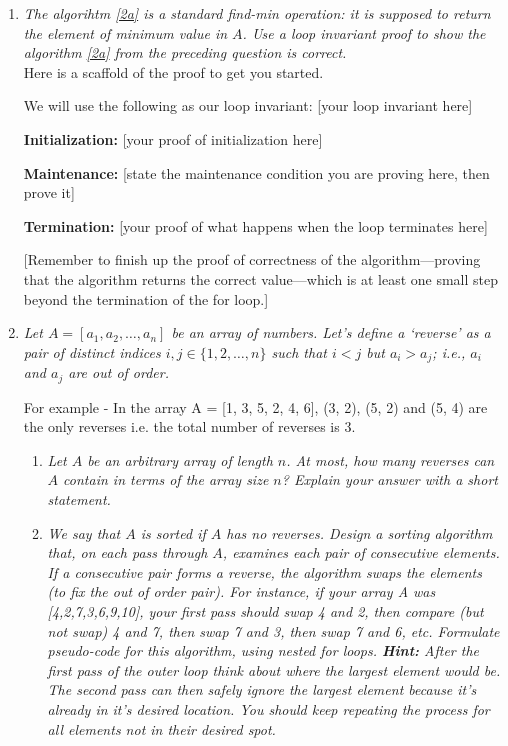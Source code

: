\documentclass[12pt]{article}
\begin{document}
\begin{enumerate}

\pagebreak

\item \label{3} {\itshape The algorihtm \ref{2a} is a standard find-min operation: it is supposed to return the element of minimum value in $A$. Use a loop invariant proof to show the algorithm \ref{2a} from the preceding question is correct.} \\

Here is a scaffold of the proof to get you started.

We will use the following as our loop invariant: [your loop invariant here]

\textbf{Initialization:} [your proof of initialization here]

\textbf{Maintenance:} [state the maintenance condition you are proving here, then prove it]

\textbf{Termination:} [your proof of what happens when the loop terminates here]

[Remember to finish up the proof of correctness of the algorithm---proving that the algorithm returns the correct value---which is at least one small step beyond the termination of the for loop.]

\pagebreak

\item {\itshape Let $A = [ a_{1}, a_{2}, \ldots, a_{n} ]$ be an array of numbers. Let's define a \textit{`reverse'} as a pair of distinct indices $i, j \in \{ 1, 2, \ldots, n\}$ such that $i < j$ but $a_{i} > a_{j}$; i.e., $a_{i}$ and $a_{j}$ are out of order.

For example - In the array A = [1, 3, 5, 2, 4, 6], (3, 2), (5, 2) and (5, 4) are the only reverses i.e. the total number of reverses is 3. } 
\begin{enumerate}
\item \label{4a} {\itshape Let $A$ be an arbitrary array of length $n$. At most, how many reverses can $A$ contain in terms of the array size $n$? Explain your answer with a short statement.}\\


\pagebreak 

\item \label{4b} {\itshape We say that $A$ is sorted if $A$ has no reverses. Design a sorting algorithm that, on each pass through $A$, examines
each pair of consecutive elements. If a consecutive pair forms a reverse, the algorithm swaps the elements (to fix the out of order pair). For instance, if your array A was [4,2,7,3,6,9,10], your first pass should swap 4 and 2, then compare (but not swap) 4 and 7, then swap 7 and 3, then swap 7 and 6, etc. Formulate pseudo-code for this algorithm, using nested for loops. \textbf{Hint:} After the first pass of the outer loop think about where the largest element would be. The second pass can then safely ignore the largest element because it's already in it's desired location. You should keep repeating the process for all elements not in their desired spot.}\\


\end{enumerate}
\end{enumerate}
\end{document}
